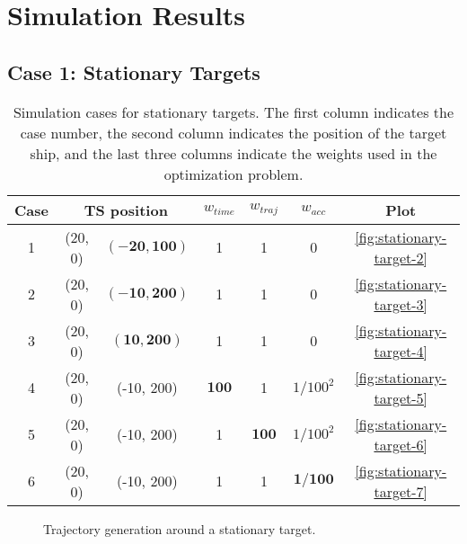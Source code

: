 \section{Simulation Results}\label{sec:simulation-results}


\subsection{Case 1: Stationary Targets}
\label{sec:case-1-stationary-targets}

\begin{table}
    \centering
    \begin{tabular}{|c|c|c|c|c|c|c|}
        \hline
        Case & \multicolumn{2}{c|}{TS position} & $w_{time}$ & $w_{traj}$ & $w_{acc}$ & Plot \\
        \hline
        1 & (20, 0) & $\mathbf{(-20, 100)}$ & 1 & 1 & 0 & \cref{fig:stationary-target-2} \\
        \hline
        2 & (20, 0) & $\mathbf{(-10, 200)}$ & 1 & 1 & 0 & \cref{fig:stationary-target-3} \\
        \hline
        3 & (20, 0) & $\mathbf{(10, 200)}$ & 1 & 1 & 0 & \cref{fig:stationary-target-4} \\
        \hline
        4 & (20, 0) & (-10, 200) & $\mathbf{100}$ & 1 & $1/100^2$ & \cref{fig:stationary-target-5} \\
        \hline
        5 & (20, 0) & (-10, 200) & 1 & $\mathbf{100}$ & $1/100^2$ & \cref{fig:stationary-target-6} \\
        \hline
        6 & (20, 0) & (-10, 200) & 1 & 1 & $\mathbf{1/100}$ & \cref{fig:stationary-target-7} \\
        \hline
    \end{tabular}
    \caption{Simulation cases for stationary targets. The first column indicates the case number, the second column indicates the position of the target ship, and the last three columns indicate the weights used in the optimization problem.}
    \label{tab:stationary-targets}
\end{table}


\begin{figure}
    \centering
    
    \caption{Trajectory generation around a stationary target. }
    \label{fig:stationary-target}
\end{figure}


